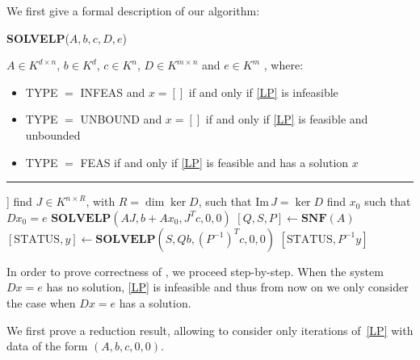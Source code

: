 \documentclass[a4paper,oneside,11pt]{article}
\begin{document}
We first give a formal description of our algorithm:

\begin{algorithm}
    \caption{\textbf{SOLVELP}($A,b,c,D,e$)}\label{algo_LP}
    \begin{algorithmic}[1]
      \REQUIRE
      $A \in K^{d\times n}$, $b \in K^d$, $c \in K^n$, $D \in K^{m \times n}$ and $e \in K^m$
      \ENSURE [TYPE, $x$], where:
      \vspace{-0.25cm}
      \begin{itemize}
      \item[]
        TYPE $=$ INFEAS and $x=[]$ if and only if \eqref{LP} is infeasible
      \vspace{-0.25cm}
      \item[]
        TYPE $=$ UNBOUND and $x=[]$ if and only if \eqref{LP} is feasible and unbounded
      \vspace{-0.25cm}
      \item[]
        TYPE $=$ FEAS if and only if \eqref{LP} is feasible and has a solution $x$
      \end{itemize}
      \vspace{-0.1cm}
      \hrule
      \vspace{0.1cm}
      \RETURN [INFEAS, []]
      \ENDIF
      \STATE find $J \in K^{n \times R}$, with $R = \dim\ker D$, such that $\text{Im}\, J = \ker D$
      \STATE find $x_0$ such that $Dx_0=e$
      \RETURN $\textbf{SOLVELP}(AJ,b+A x_0,J^T c,0,0)$
      \ENDIF
      \STATE $[Q,S,P] \leftarrow \textbf{SNF}(A)$
      \STATE $[\mathrm{STATUS}, y] \leftarrow \textbf{SOLVELP}(S,Qb,(P^{-1})^Tc,0,0)$
      \RETURN $[\mathrm{STATUS}, P^{-1}y]$
      \ELSE
      \STATE
      \ENDIF
    \end{algorithmic}
\end{algorithm}

In order to prove correctness of , we proceed step-by-step.
When the system $Dx=e$ has no solution, \eqref{LP} is infeasible and
thus from now on we only consider the case when $Dx=e$ has a solution.

We first prove a reduction result, allowing to consider only iterations
of~\eqref{LP} with data of the form $(A,b,c,0,0)$.
\end{document}
